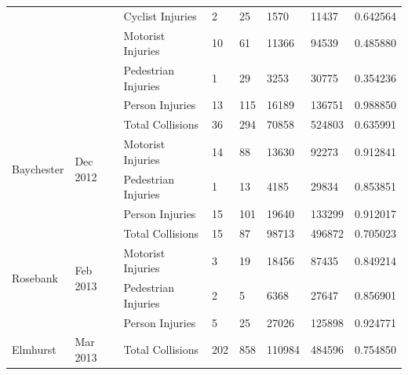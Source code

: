 \documentclass[10pt,journal,compsoc]{IEEEtran}
\begin{document}
\begin{table}[]
\begin{tabular}{|l|l|l|l|l|l|l|l|}
                                               &                             & Cyclist Injuries    & 2         & 25       & 1570       & 11437     & 0.642564 \\ \cline{3-8} 
                                               &                             & Motorist Injuries   & 10        & 61       & 11366      & 94539     & 0.485880 \\ \cline{3-8} 
                                               &                             & Pedestrian Injuries & 1         & 29       & 3253       & 30775     & 0.354236 \\ \cline{3-8} 
                                               &                             & Person Injuries     & 13        & 115      & 16189      & 136751    & 0.988850 \\ \hline
\multirow{4}{*}{Baychester}                    & \multirow{4}{*}{Dec 2012} & Total Collisions    & 36        & 294      & 70858      & 524803    & 0.635991 \\ \cline{3-8} 
                                               &                             & Motorist Injuries   & 14        & 88       & 13630      & 92273     & 0.912841 \\ \cline{3-8} 
                                               &                             & Pedestrian Injuries & 1         & 13       & 4185       & 29834     & 0.853851 \\ \cline{3-8} 
                                               &                             & Person Injuries     & 15        & 101      & 19640      & 133299    & 0.912017 \\ \hline
\multirow{4}{*}{Rosebank}                      & \multirow{4}{*}{Feb 2013} & Total Collisions    & 15        & 87       & 98713      & 496872    & 0.705023 \\ \cline{3-8} 
                                               &                             & Motorist Injuries   & 3         & 19       & 18456      & 87435     & 0.849214 \\ \cline{3-8} 
                                               &                             & Pedestrian Injuries & 2         & 5        & 6368       & 27647     & 0.856901 \\ \cline{3-8} 
                                               &                             & Person Injuries     & 5         & 25       & 27026      & 125898    & 0.924771 \\ \hline
\multirow{5}{*}{Elmhurst}                      & \multirow{5}{*}{Mar 2013} & Total Collisions    & 202       & 858      & 110984     & 484596    & 0.754850 \\ \cline{3-8} 

\end{tabular}
\end{table}
\end{document}
